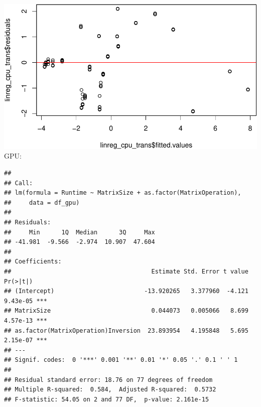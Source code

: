 \documentclass[
]{article}
\newenvironment{Shaded}{\begin{snugshade}}{\end{snugshade}}
\newcommand{\DataTypeTok}[1]{\textcolor[rgb]{0.13,0.29,0.53}{#1}}
\newcommand{\KeywordTok}[1]{\textcolor[rgb]{0.13,0.29,0.53}{\textbf{#1}}}
\newcommand{\NormalTok}[1]{#1}
\newcommand{\OperatorTok}[1]{\textcolor[rgb]{0.81,0.36,0.00}{\textbf{#1}}}
\newcommand{\StringTok}[1]{\textcolor[rgb]{0.31,0.60,0.02}{#1}}
\begin{document}
\includegraphics{main_files/figure-latex/unnamed-chunk-11-3.pdf} GPU:

\begin{Shaded}
\end{Shaded}

\begin{verbatim}
## 
## Call:
## lm(formula = Runtime ~ MatrixSize + as.factor(MatrixOperation), 
##     data = df_gpu)
## 
## Residuals:
##     Min      1Q  Median      3Q     Max 
## -41.981  -9.566  -2.974  10.907  47.604 
## 
## Coefficients:
##                                       Estimate Std. Error t value Pr(>|t|)    
## (Intercept)                         -13.920265   3.377960  -4.121 9.43e-05 ***
## MatrixSize                            0.044073   0.005066   8.699 4.57e-13 ***
## as.factor(MatrixOperation)Inversion  23.893954   4.195848   5.695 2.15e-07 ***
## ---
## Signif. codes:  0 '***' 0.001 '**' 0.01 '*' 0.05 '.' 0.1 ' ' 1
## 
## Residual standard error: 18.76 on 77 degrees of freedom
## Multiple R-squared:  0.584,  Adjusted R-squared:  0.5732 
## F-statistic: 54.05 on 2 and 77 DF,  p-value: 2.161e-15
\end{verbatim}
\end{document}
